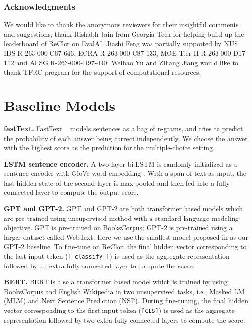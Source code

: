 \documentclass{article} \usepackage{iclr2020_conference,times}
\begin{document}
\subsubsection*{Acknowledgments}
We would like to thank the anonymous reviewers for their insightful comments and suggestions; thank Rishabh Jain from Georgia Tech for helping build up the leaderboard of ReClor on EvalAI. Jiashi Feng was partially supported by NUS IDS R-263-000-C67-646,  ECRA R-263-000-C87-133, MOE Tier-II R-263-000-D17-112 and AI.SG R-263-000-D97-490. Weihao Yu and Zihang Jiang would like to thank TFRC program for the support of computational resources.




\newpage
\appendix
\section{Baseline Models}
\label{appendix-baseline-models}
\textbf{fastText. }
FastText ~\citep{joulin2017bag} models sentences as a bag of n-grams, and tries to predict the probability of each answer being correct independently. We choose the answer with the highest score as the prediction for the multiple-choice setting. 

\textbf{LSTM sentence encoder. }
A two-layer bi-LSTM is randomly initialized as a sentence encoder with GloVe word embedding \citep{pennington2014glove}. With a span of text as input, the last hidden state of the second layer is max-pooled and then fed into a fully-connected layer to compute the output score.
	
	
\textbf{GPT and GPT-2. }
GPT \citep{radford2018improving} and GPT-2 \citep{radford2019language} are both transformer \citep{vaswani2017attention} based models which are pre-trained using unsupervised method with a standard language modeling objective. GPT is pre-trained on BooksCorpus; GPT-2 is pre-trained using a larger dataset called WebText. Here we use the smallest model proposed in \citep{radford2019language} as our GPT-2 baseline. To fine-tune on ReClor, the final hidden vector corresponding to the last input token ({\tt [\_classify\_]}) is used as the aggregate representation followed by an extra fully connected layer to compute the score.
	
	
\textbf{BERT. }
BERT \citep{devlin2019bert} is also a transformer \citep{vaswani2017attention} based model which is trained by using BooksCorpus \citep{zhu2015aligning} and  English Wikipedia in two unsupervised tasks, i.e., Masked LM (MLM) and Next Sentence Prediction (NSP). During fine-tuning, the final hidden vector corresponding to the first input token ({\tt [CLS]}) is used as the aggregate representation followed by two extra fully connected layers to compute the score.
\end{document}
